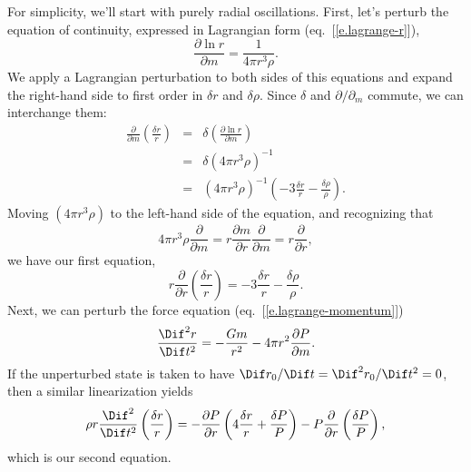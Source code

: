 For simplicity, we'll start with purely radial oscillations.
First, let's perturb the equation of continuity, expressed in Lagrangian form (eq.~[\ref{e.lagrange-r}]),
\[
\frac{\partial\ln r}{\partial m} = \frac{1}{4\pi r^{3}\rho}.
\]
We apply a Lagrangian perturbation to both sides of this equations and expand the right-hand side to first order in $\delta r$ and $\delta \rho$.  Since $\delta$ and $\partial/\partial_{m}$ commute, we can interchange them:
\begin{eqnarray*}
\frac{\partial}{\partial m}\left(\frac{\delta r}{r}\right) &=& \delta\left(\frac{\partial \ln r}{\partial m}\right)\\
	&=& \delta\left( 4\pi r^{3}\rho\right)^{-1} \\
	&=& \left(4\pi r^{3}\rho\right)^{-1}\left(-3 \frac{\delta r}{r} - \frac{\delta\rho}{\rho}\right).
\end{eqnarray*}
Moving $(4\pi r^{3}\rho)$ to the left-hand side of the equation, and recognizing that
\[ 4\pi r^{3}\rho \frac{\partial}{\partial m} = r\frac{\partial m}{\partial r}\frac{\partial }{\partial m} = r\frac{\partial }{\partial r}, \]
we have our first equation,
\begin{equation}\label{e.linearized-radial-continuity}
r\frac{\partial}{\partial r}\left(\frac{\delta r}{r}\right) = -3\frac{\delta r}{r} - \frac{\delta \rho}{\rho}.
\end{equation}
Next, we can perturb the force equation (eq.~[\ref{e.lagrange-momentum}])
\[
\frac{\Dif^{2} r}{\Dif t^{2}} = -\frac{Gm}{ r^{2}} - 4\pi r^{2}\frac{\partial P}{\partial m}.
\]
If the unperturbed state is taken to have $\Dif r_{0}/\Dif t = \Dif^{2} r_{0}/\Dif t^{2} = 0$, then a similar linearization yields
\begin{equation}\label{e.linearized-radial-momentum}
\rho r \frac{\Dif^{2} }{\Dif t^{2}}\left(\frac{\delta r}{r}\right) = -\frac{\partial P}{\partial r}\left(4\frac{\delta r}{r} + \frac{\delta P}{P}\right) - P \frac{\partial}{\partial r}\left(\frac{\delta P}{P}\right),
\end{equation}
which is our second equation.

